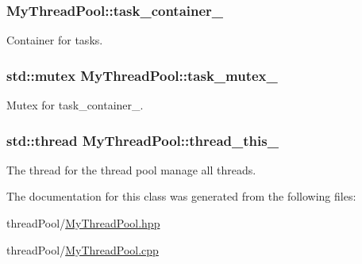 \subsubsection[{\texorpdfstring{task\+\_\+container\+\_\+}{task_container_}}]{ My\+Thread\+Pool\+::task\+\_\+container\+\_\+\hspace{0.3cm}{\ttfamily [private]}}\hypertarget{classMyThreadPool_a2dcc9c71c8674944854b7b9a494e0efe}{}\label{classMyThreadPool_a2dcc9c71c8674944854b7b9a494e0efe}
Container for tasks. 
\subsubsection[{\texorpdfstring{task\+\_\+mutex\+\_\+}{task_mutex_}}]{\setlength{\rightskip}{0pt plus 5cm}std\+::mutex My\+Thread\+Pool\+::task\+\_\+mutex\+\_\+\hspace{0.3cm}{\ttfamily [private]}}\hypertarget{classMyThreadPool_abf915ad66f55fbfb61d5b9693cc2f6d6}{}\label{classMyThreadPool_abf915ad66f55fbfb61d5b9693cc2f6d6}
Mutex for task\+\_\+container\+\_\+. 
\subsubsection[{\texorpdfstring{thread\+\_\+this\+\_\+}{thread_this_}}]{\setlength{\rightskip}{0pt plus 5cm}std\+::thread My\+Thread\+Pool\+::thread\+\_\+this\+\_\+\hspace{0.3cm}{\ttfamily [private]}}\hypertarget{classMyThreadPool_a3ce4bece158ca272e1acf88a9f25cde4}{}\label{classMyThreadPool_a3ce4bece158ca272e1acf88a9f25cde4}
The thread for the thread pool manage all threads. 

The documentation for this class was generated from the following files\+:\begin{DoxyCompactItemize}
\item 
thread\+Pool/\hyperlink{MyThreadPool_8hpp}{My\+Thread\+Pool.\+hpp}\item 
thread\+Pool/\hyperlink{MyThreadPool_8cpp}{My\+Thread\+Pool.\+cpp}\end{DoxyCompactItemize}
